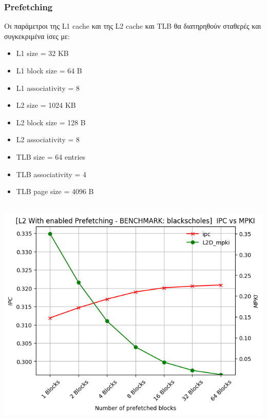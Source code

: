 \newpage
\subsubsection{Prefetching}
Οι παράμετροι της \textlatin{L1 cache} και της \textlatin{L2 cache} και
\textlatin{TLB} θα διατηρηθούν σταθερές και συγκεκριμένα ίσες με:

\begin{multicols}{2}
    \begin{itemize}
        \item L1 size = 32 KB  
        \item L1 block size = 64 B
        \item L1 associativity = 8
        \item L2 size = 1024 KB  
        \item L2 block size = 128 B
        \item L2 associativity = 8
        \item TLB size = 64 entries  
        \item TLB associativity = 4
        \item TLB page size = 4096 B
    \end{itemize}
\end{multicols}


\vspace{1cm}
\begin{minipage}{\textwidth}
    \begin{center}
        \\
        \vspace{3mm}
        \includegraphics[scale=0.70]{graphs/PREF/blackscholes.png}
        \vspace{6mm}
    \end{center}
\end{minipage}


